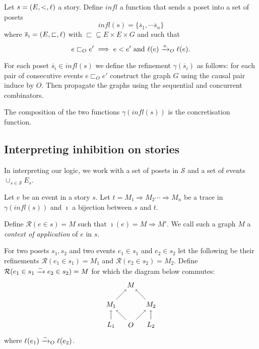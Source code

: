 \begin{definition}
  Let $s = (E,<,\ell)$ a story. Define $\textit{infl}$ a function that sends a poset into a set of posets
  \[
  \textit{infl}(s) =\{\overline{s}_1,\cdots\overline{s}_n\}
  \]
  where $\overline{s}_i = (E,\sqsubset,\ell)$ with $\sqsubset\subseteq E\times E\times G$ and such that
  \[
  e \sqsubset_O e' \implies e < e' \text{ and }\ell(e)\mathrel{\xrightarrow{+}}_O \ell(e).
  \]

  For each poset $\overline{s}_i\in\textit{infl}(s)$ we define the refinement $\gamma(\overline{s}_i)$ as follows: for each pair of consecutive events $e \sqsubset_O e'$ construct the graph $G$ using the causal pair induce by $O$. Then propagate the graphs using the sequential and concurrent combinators.

  The composition of the two functions $\gamma(\textit{infl}(s))$ is the concretisation function.
\end{definition}

\subsection{Interpreting inhibition on stories}

In interpreting our logic, we work with a set of posets in $\mathcal{S}$ and a set of events $\cup_{s\in\mathcal{S}} E_s$.

\begin{definition}
  Let $e$ be an event in a story $s$. Let $t = M_1{\Rightarrow} M_2\cdots {\Rightarrow} M_n$ be a trace in $\gamma(\textit{infl}(s))$ and $\imath$ a bijection between $s$ and $t$.

  Define $\mathcal{R}(e\in s) = M$ such that $\imath(e) = M{\Rightarrow}M'$. We call such a graph $M$ a \emph{context of application} of $e$ in $s$.
\end{definition}


\begin{definition}
\label{def:ref_neg_infl}
  For two posets $s_1,s_2$ and two events $e_1\in s_1$ and $e_2\in s_2$ let the following be their refinements $\mathcal{R}(e_1\in s_1) = M_1$ and $\mathcal{R}(e_2\in s_2) = M_2$. Define $\mathcal{R}(e_1\in s_1\mathrel{\xrightarrow{-}} e_2\in s_2) = M$ for which the diagram below commutes:
  \[
  \begin{tikzpicture} %
    \node (o) at (0,0) {\(O\)};
    \node (n) at (0,2) {\(M\)};
    \node (l1) at (-1,0) {\(L_1\)};
    \node (l2) at (1,0) {\(L_2\)};
    \node (n1) at (-1,1) {\(M_1\)};
    \node (n2) at (1,1) {\(M_2\)};
    \draw [->] (l1) -- (n1);
    \draw [->] (l2) -- (n2);
    \draw [->] (o) -- (n1);
    \draw [->] (o) -- (n2);
    \draw [->] (n1) -- (n);
    \draw [->] (n2) -- (n);
  \end{tikzpicture}
  \]
  where $\ell(e_1)\mathrel{\xrightarrow{-}}_O\ell(e_2)$.
\end{definition}
